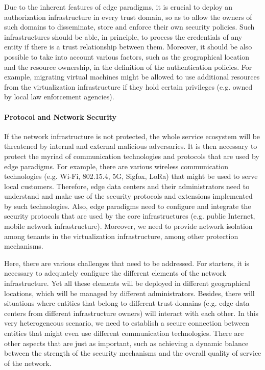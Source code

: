 \documentclass[twocolumn,preprint,3p]{elsarticle}
\begin{document}
Due to the inherent features of edge paradigms, it is crucial to deploy an authorization infrastructure in every trust domain, so as to allow the owners of such domains to disseminate, store and enforce their own security policies. Such infrastructures should be able, in principle, to process the credentials of any entity if there is a trust relationship between them. Moreover, it should be also possible to take into account various factors, such as the geographical location and the resource ownership, in the definition of the authentication policies. For example, migrating virtual machines might be allowed to use additional resources from the virtualization infrastructure if they hold certain privileges (e.g. owned by local law enforcement agencies).

\paragraph{Protocol and Network Security} If the network infrastructure is not protected, the whole service ecosystem will be threatened by internal and external malicious adversaries. It is then necessary to protect the myriad of communication technologies and protocols that are used by edge paradigms. For example, there are various wireless communication technologies (e.g. Wi-Fi, 802.15.4, 5G, Sigfox, LoRa) that might be used to serve local customers. Therefore, edge data centers and their administrators need to understand and make use of the security protocols and extensions implemented by such technologies. Also, edge paradigms need to configure and integrate the security protocols that are used by the core infrastructures (e.g. public Internet, mobile network infrastructure). Moreover, we need to provide network isolation among tenants in the virtualization infrastructure, among other protection mechanisms.

Here, there are various challenges that need to be addressed. For starters, it is necessary to adequately configure the different elements of the network infrastructure. Yet all these elements will be deployed in different geographical locations, which will be managed by different administrators. Besides, there will situations where entities that belong to different trust domains (e.g. edge data centers from different infrastructure owners) will interact with each other. In this very heterogeneous scenario, we need to establish a secure connection between entities that might even use different communication technologies. There are other aspects that are just as important, such as achieving a dynamic balance between the strength of the security mechanisms and the overall quality of service of the network.
\end{document}
